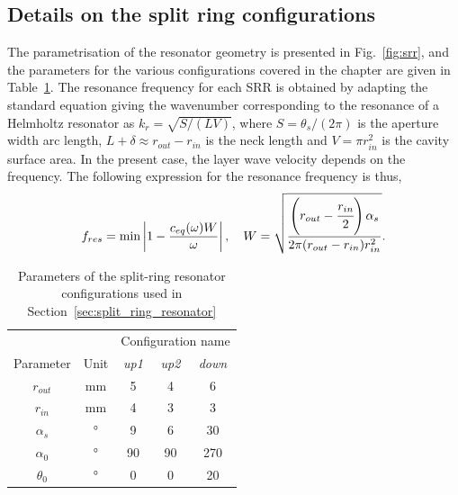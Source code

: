 \subsection{Details on the split ring configurations}
\label{app:split_ring_params}
The parametrisation of the resonator geometry is presented in Fig.~\ref{fig:srr}, and the parameters for the various configurations covered in the chapter are given in Table~\ref{tab:srr_params}. The resonance frequency for each SRR is obtained by adapting the standard equation giving the wavenumber corresponding to the resonance of a Helmholtz resonator \cite{bruneau2006} as $k_r = \sqrt{S/(LV)}$, where $S=\theta_s/(2\pi)$ is the aperture width arc length, $L+\delta \approx r_{out}-r_{in}$ is the neck length and $V = \pi r_{in}^2$ is the cavity surface area. In the present case, the layer wave velocity depends on the frequency. The following expression for the resonance frequency is thus,
\begin{equation}
        f_{res} = \mathrm{min}\left| 1 - \frac{c_{eq}(\omega)W}{\omega} \right|, \quad W = \sqrt{\frac{\left(r_{out} - \cfrac{r_{in}}2\right)\alpha_s}{2\pi (r_{out}- r_{in})r_{in}^2}}.
\end{equation}

\begin{table}[ht]
\begin{minipage}[b]{.4\textwidth}
    \centering
    
    \label{fig:srr}
\end{minipage}\hfill\begin{minipage}[b]{.48\textwidth}
    \centering
    \begin{tabular}{cc|ccc}
    \hline 
    \hline
    & & \multicolumn{3}{c}{Configuration name} \\
    Parameter & Unit & \textit{up1} & \textit{up2} & \textit{down} \\ \hline
    $r_{out}$ & mm & 5 & 4 & 6 \\
    $r_{in}$ & mm & 4 & 3 & 3  \\
    $\alpha_s$ & ° & 9 & 6 & 30 \\
    $\alpha_0$ &° & 90 & 90 & 270 \\ 
    $\theta_0$ & ° & 0 & 0 & 20 \\
    \hline \hline
\end{tabular}
\caption{Parameters of the split-ring resonator configurations used in Section~\ref{sec:split_ring_resonator}}
\label{tab:srr_params}
\end{minipage}
\end{table} 
\endgroup